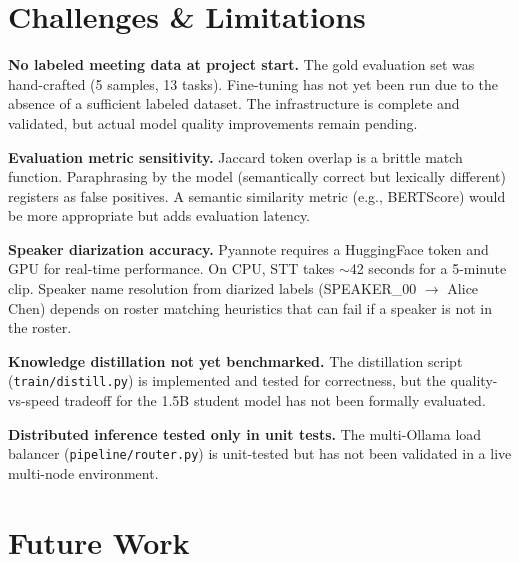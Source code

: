 \documentclass[12pt,a4paper]{article}
\begin{document}
\section{Challenges \& Limitations}

\textbf{No labeled meeting data at project start.} The gold evaluation set was hand-crafted (5 samples, 13 tasks). Fine-tuning has not yet been run due to the absence of a sufficient labeled dataset. The infrastructure is complete and validated, but actual model quality improvements remain pending.

\textbf{Evaluation metric sensitivity.} Jaccard token overlap is a brittle match function. Paraphrasing by the model (semantically correct but lexically different) registers as false positives. A semantic similarity metric (e.g., BERTScore) would be more appropriate but adds evaluation latency.

\textbf{Speaker diarization accuracy.} Pyannote requires a HuggingFace token and GPU for real-time performance. On CPU, STT takes $\sim$42 seconds for a 5-minute clip. Speaker name resolution from diarized labels (SPEAKER\_00 $\rightarrow$ Alice Chen) depends on roster matching heuristics that can fail if a speaker is not in the roster.

\textbf{Knowledge distillation not yet benchmarked.} The distillation script (\texttt{train/distill.py}) is implemented and tested for correctness, but the quality-vs-speed tradeoff for the 1.5B student model has not been formally evaluated.

\textbf{Distributed inference tested only in unit tests.} The multi-Ollama load balancer (\texttt{pipeline/router.py}) is unit-tested but has not been validated in a live multi-node environment.

\section{Future Work}
\end{document}
